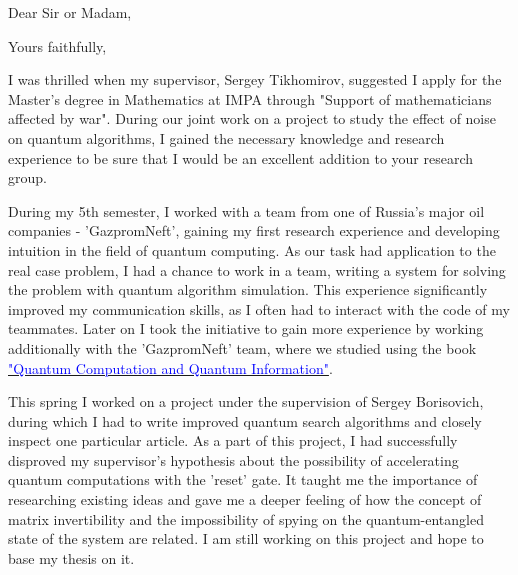 \documentclass[11pt,a4paper,sans]{moderncv}        %
\begin{document}
	\clearpage
	\date{June 05, 2022}
	\opening{Dear Sir or Madam,}
	\closing{Yours faithfully,}
	\makelettertitle
	
	I was thrilled when my supervisor, Sergey Tikhomirov, suggested I apply for the Master's degree in Mathematics at IMPA through "Support of mathematicians affected by war". During our joint work on a project to study the effect of noise on quantum algorithms, I gained the necessary knowledge and research experience to be sure that I would be an excellent addition to your research group.
	
	During my 5th semester, I worked with a team from one of Russia's major oil companies - 'GazpromNeft', gaining my first research experience and developing intuition in the field of quantum computing. As our task had application to the real case problem, I had a chance to work in a team, writing a system for solving the problem with quantum algorithm simulation. This experience significantly improved my communication skills, as I often had to interact with the code of my teammates. Later on I took the initiative to gain more experience by working additionally with the 'GazpromNeft' team, where we studied using the book \href{https://www.cambridge.org/ru/academic/subjects/physics/quantum-physics-quantum-information-and-quantum-computation/quantum-computation-and-quantum-information-10th-anniversary-edition?format=HB&isbn=9781107002173}{\textcolor{blue}{"Quantum Computation and Quantum Information"}}.
	
	This spring I worked on a project under the supervision of Sergey Borisovich, during which I had to write improved quantum search algorithms and closely inspect one particular article. As a part of this project, I had successfully disproved my supervisor's hypothesis about the possibility of accelerating quantum computations with the 'reset' gate. It taught me the importance of researching existing ideas and gave me a deeper feeling of how the concept of matrix invertibility and the impossibility of spying on the quantum-entangled state of the system are related. I am still working on this project and hope to base my thesis on it.
	
\end{document}
